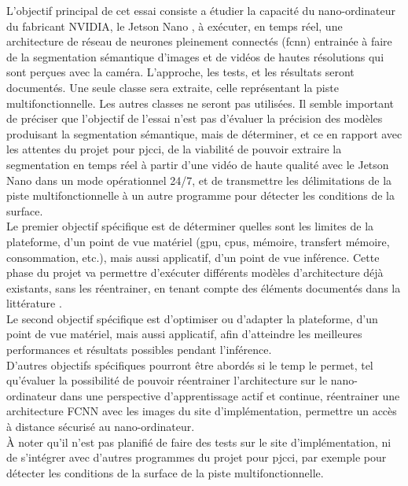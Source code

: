 ﻿\noindent L'objectif principal de cet essai consiste a étudier la capacité du nano-ordinateur du fabricant NVIDIA, le Jetson Nano \parencite{nvidia_jetson_2019}, à exécuter, en temps réel, une architecture de réseau de neurones pleinement connectés (\acrshort{fcnn}) entrainée à faire de la segmentation sémantique d'images et de vidéos de hautes résolutions qui sont perçues avec la caméra. L’approche, les tests, et les résultats seront documentés. Une seule classe sera extraite, celle représentant la piste multifonctionnelle. Les autres classes ne seront pas utilisées. Il semble important de préciser que l'objectif de l'essai n'est pas d'évaluer la précision des modèles produisant la segmentation sémantique, mais de déterminer, et ce en rapport avec les attentes du projet pour \acrshort{pjcci}, de la viabilité de pouvoir extraire la segmentation en temps réel à partir d'une vidéo de haute qualité avec le Jetson Nano dans un mode opérationnel 24/7, et de transmettre les délimitations de la piste multifonctionnelle à un autre programme pour détecter les conditions de la surface.
\vspace{0.5\baselineskip}
\\
\noindent Le premier objectif spécifique est de déterminer quelles sont les limites de la plateforme, d'un point de vue matériel (\acrshort{gpu}, \acrshort{cpu}s, mémoire, transfert mémoire, consommation, etc.), mais aussi applicatif, d'un point de vue inférence. Cette phase du projet va permettre d'exécuter différents modèles d'architecture déjà existants, sans les réentrainer, en tenant compte des éléments documentés dans la littérature \parencite{nguyen_mavnet_2019, zheng_real-time_2020, nvidia_jetson_2019-1}.
\vspace{0.5\baselineskip}
\\
\noindent Le second objectif spécifique est d'optimiser ou d'adapter la plateforme, d'un point de vue matériel, mais aussi applicatif, afin d'atteindre les meilleures performances et résultats possibles pendant l'inférence.
\vspace{0.5\baselineskip}
\\
\noindent D'autres objectifs spécifiques pourront être abordés si le temp le permet, tel qu'évaluer la possibilité de pouvoir réentrainer l’architecture sur le nano-ordinateur dans une perspective d’apprentissage actif et continue, réentrainer une architecture FCNN avec les images du site d’implémentation, permettre un accès à distance sécurisé au nano-ordinateur.
\vspace{0.5\baselineskip}
\\
\noindent À noter qu'il n'est pas planifié de faire des tests sur le site d'implémentation, ni de s'intégrer avec d'autres programmes du projet pour \acrshort{pjcci}, par exemple pour détecter les conditions de la surface de la piste multifonctionnelle. 
\vspace{0.5\baselineskip}
